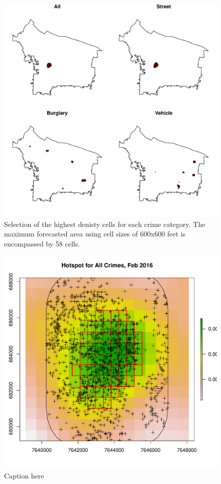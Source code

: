 \documentclass[12pt,letterpaper]{article}
\theoremstyle{plain}
\theoremstyle{plain}
\theoremstyle{definition}
\theoremstyle{remark}
\begin{document}
\begin{figure}[h!]
    \centering
    \includegraphics[]{figures/max_areas.pdf}
    \caption{Selection of the highest denisty cells for each crime category. The maximum forecasted area using cell sizes of 600x600 feet is encompassed by 58 cells.}
    \label{fig:figure1}
\end{figure}


\begin{figure}[h!]
    \centering
    \includegraphics[scale=0.9]{figures/hotspot_all.pdf}
    \caption{Caption here}
    \label{fig:figure1}
\end{figure}
\end{document}
